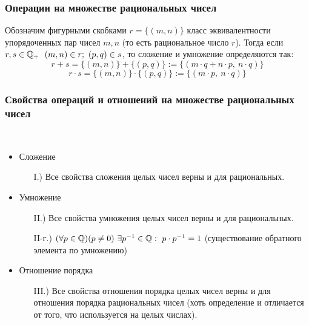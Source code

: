 \subsubsection*{Операции на множестве рациональных чисел}

Обозначим фигурными скобками $r = \{(m, n)\}$ класс эквивалентности
упорядоченных пар чисел $m, n$ (то есть рациональное число $r$).
Тогда если $r, s \in \Q_+ \ \ (m, n) \in r;\ (p, q) \in s$, то
сложение и умножение определяются так:
\[
    r + s = \{(m, n)\} + \{(p, q)\} :=
    \{(m \cdot q + n \cdot p,\ n \cdot q)\}
\]
\[
    r \cdot s = \{(m, n)\} \cdot \{(p, q)\} :=
    \{(m \cdot p,\ n \cdot q)\}
\]

\subsubsection*{Свойства операций и отношений на
множестве рациональных чисел}
\begin{theorem}~

    \begin{itemize}
        \item Сложение
        \begin{itemize}
            \item[I.)] Все свойства сложения целых чисел
                верны и для рациональных.
        \end{itemize}
        \item Умножение
        \begin{itemize}
            \item[II.)] Все свойства умножения целых чисел
                верны и для рациональных.
            \item[II-г.)] $(\forall p \in \mathbb{Q})(p \neq 0)\ \exists
                p^{-1} \in \mathbb{Q} :\ p \cdot p^{-1} = 1$
                (существование обратного элемента по умножению)
        \end{itemize}
        \item Отношение порядка
        \begin{itemize}
            \item[III.)] Все свойства отношения порядка целых
                чисел верны и для отношения порядка рациональных
                чисел (хоть определение и отличается от того,
                что используется на целых числах).
        \end{itemize}
    \end{itemize}
\end{theorem}